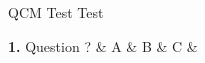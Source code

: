 \documentclass[11pt,a4paper]{article}
\begin{document}
	\ExamBanner
	\StudentInfoBox

	\smallspace

	\begin{qcmbox}{ QCM Test }
		Test
		\begin{qcmtable}
			\textbf{1.} Question ? & A & B & C &  \\
			\hline
		\end{qcmtable}
	\end{qcmbox}
\end{document}

